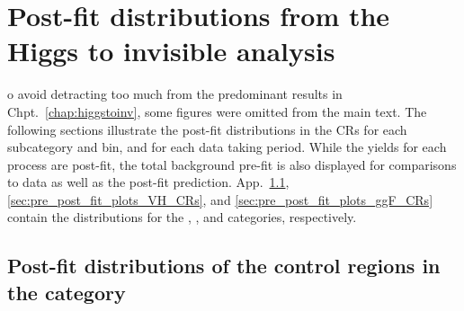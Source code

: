 \chapter{Post-fit distributions from the Higgs to invisible analysis}
\label{app:supplementary_hinv_plots}

o avoid detracting too much from the predominant results in Chpt.~\ref{chap:higgstoinv}, some figures were omitted from the main text. The following sections illustrate the post-fit distributions in the \glspl{CR} for each subcategory and \ptmiss bin, and for each data taking period. While the yields for each process are post-fit, the total background pre-fit is also displayed for comparisons to data as well as the post-fit prediction. App.~\ref{sec:pre_post_fit_plots_ttH_CRs}, \ref{sec:pre_post_fit_plots_VH_CRs}, and \ref{sec:pre_post_fit_plots_ggF_CRs} contain the distributions for the \ttH, \VH, and \ggH categories, respectively.




\section{Post-fit distributions of the control regions in the \texorpdfstring{\ttH}{ttH} category}
\label{sec:pre_post_fit_plots_ttH_CRs}

